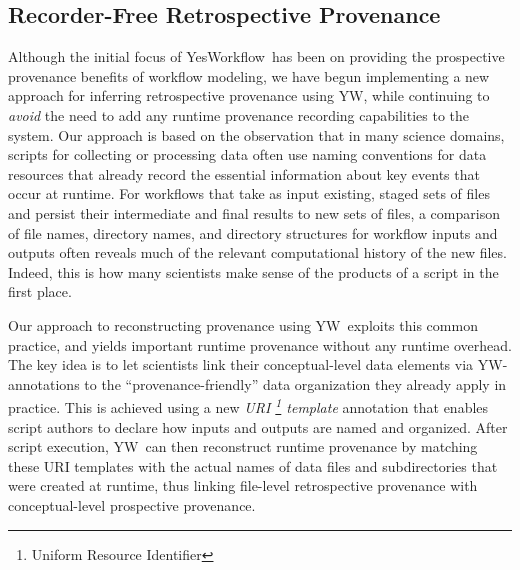 \documentclass[nocopyrightspace]{sigplanconf}
\newcommand{\YW}{\textsf{YesWorkflow}}
\newcommand{\yw}{\textsf{YW}}
\begin{document}
\subsection*{Recorder-Free Retrospective Provenance} 
Although the initial focus of \YW\ has been on providing the
prospective provenance benefits of %
workflow modeling, we have begun implementing a new approach for
inferring retrospective provenance using \yw, while continuing to
\emph{avoid} the need to add any runtime provenance recording
capabilities to the system. Our approach is based on the observation
that in many science domains, scripts for collecting or 
processing data often
use naming conventions for data resources that already record the essential
information about key events that occur at runtime. For workflows that
take as input existing, staged sets of files and persist their
intermediate and final results to new sets of files, a comparison of
file names, directory names, and directory structures for workflow
inputs and outputs often reveals much of the relevant computational
history of the new files. Indeed, this is how many scientists make
sense of the products of a script in the first place.

Our approach to reconstructing provenance using \yw\ exploits this
common practice, and yields important runtime provenance without any
runtime overhead. The key idea is to let scientists link their
conceptual-level data elements via \yw-annotations to the
``provenance-friendly'' data organization they already apply in
practice. This is achieved using a new \emph{URI \footnote{Uniform Resource
    Identifier} template} annotation
that enables script authors to declare how inputs and outputs are
named and organized. After script execution, \yw\ can then reconstruct
runtime provenance by matching these URI templates with the actual
names of data files and subdirectories that were created at runtime,
thus linking file-level retrospective provenance with conceptual-level
prospective provenance.
\end{document}
